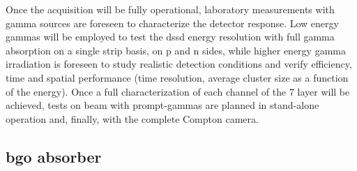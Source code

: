 Once the acquisition will be fully operational, laboratory measurements with gamma sources are foreseen to characterize the detector response. Low energy gammas will be employed to test the \gls{dssd} energy resolution with full gamma absorption on a single strip basis, on p and n sides, while higher energy gamma irradiation is foreseen to study realistic detection conditions and verify efficiency, time and spatial performance (time resolution, average cluster size as a function of the energy). Once a full characterization of each channel of the 7 layer will be achieved, tests on beam with prompt-gammas are planned in stand-alone operation and, finally, with the complete Compton camera.       
   

\subsection{\gls{bgo} absorber}\label{chap3::subsec::absNext}

